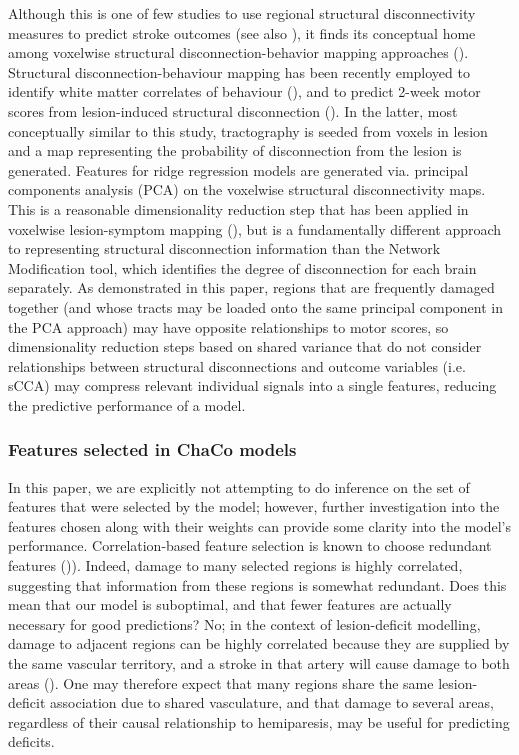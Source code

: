 \documentclass[phd,tocprelim]{cornell}
\begin{document}
Although this is one of few studies to use regional structural disconnectivity measures to predict stroke outcomes (see also \cite{Tozlu2020-qa, Kuceyeski2016-vj}), it finds its conceptual home among voxelwise structural disconnection-behavior mapping approaches (\cite{Salvalaggio2020-pe, Wawrzyniak2022-kl, Foulon2018-bj, Sperber2022-oj}). Structural disconnection-behaviour mapping has been recently employed to identify white matter correlates of behaviour (\cite{Wawrzyniak2022-kl, Foulon2018-bj}), and to predict 2-week motor scores from lesion-induced structural disconnection (\cite{Salvalaggio2020-pe}). In the latter, most conceptually similar to this study, tractography is seeded from voxels in lesion and a map representing the probability of disconnection from the lesion is generated. Features for ridge regression models are generated via. principal components analysis (PCA) on the voxelwise structural disconnectivity maps. This is a reasonable dimensionality reduction step that has been applied in voxelwise lesion-symptom mapping (\cite{Ivanova2021-nh}), but is a fundamentally different approach to representing structural disconnection information than the Network Modification tool, which identifies the degree of disconnection for each brain separately. As demonstrated in this paper, regions that are frequently damaged together (and whose tracts may be loaded onto the same principal component in the PCA approach) may have opposite relationships to motor scores, so dimensionality reduction steps based on shared variance that do not consider relationships between structural disconnections and outcome variables (i.e. sCCA) may compress relevant individual signals into a single features, reducing the predictive performance of a model. 

\subsubsection{Features selected in ChaCo models}

In this paper, we are explicitly not attempting to do inference on the set of features that were selected by the model; however, further investigation into the features chosen along with their weights can provide some clarity into the model's performance. Correlation-based feature selection is known to choose redundant features (\cite{Guyon2003-kj})). Indeed, damage to many selected regions is highly correlated, suggesting that information from these regions is somewhat redundant. Does this mean that our model is suboptimal, and that fewer features are actually necessary for good predictions? No; in the context of lesion-deficit modelling, damage to adjacent regions can be highly correlated because they are supplied by the same vascular territory, and a stroke in that artery will cause damage to both areas (\cite{Mah2014-cb, Sperber2020-kp}). One may therefore expect that many regions share the same lesion-deficit association due to shared vasculature, and that damage to several areas, regardless of their causal relationship to hemiparesis, may be useful for predicting deficits. 
\end{document}

